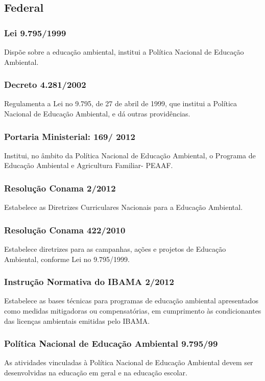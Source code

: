 \begin{subapend}
	\subsection{Federal}
	\begin{subsubapend}
		\item \subsubsection{Lei 9.795/1999}
		Dispõe sobre a educação ambiental, institui a Política Nacional de Educação Ambiental.
		\subsubsection{Decreto 4.281/2002}
		Regulamenta a Lei no 9.795, de 27 de abril de 1999, que institui a Política Nacional de Educação Ambiental, e dá outras providências.
		\subsubsection{Portaria Ministerial: 169/ 2012}
		Institui, no âmbito da Política Nacional de Educação Ambiental, o Programa de Educação Ambiental e Agricultura Familiar- PEAAF.
		\subsubsection{Resolução Conama 2/2012}
		Estabelece as Diretrizes Curriculares Nacionais para a Educação Ambiental.
		\subsubsection{Resolução Conama 422/2010}
		Estabelece diretrizes para as campanhas, ações e projetos de Educação Ambiental, conforme Lei no 9.795/1999.
		\subsubsection{Instrução Normativa do IBAMA 2/2012}
		Estabelece as bases técnicas para programas de educação ambiental apresentados como medidas mitigadoras ou compensatórias, em cumprimento às condicionantes das licenças ambientais emitidas pelo IBAMA.
		\subsubsection{Política Nacional de Educação Ambiental 9.795/99}
		As atividades vinculadas à Política Nacional de Educação Ambiental devem ser desenvolvidas na educação em geral e na educação escolar.

\end{subsubapend}
\end{subapend}
